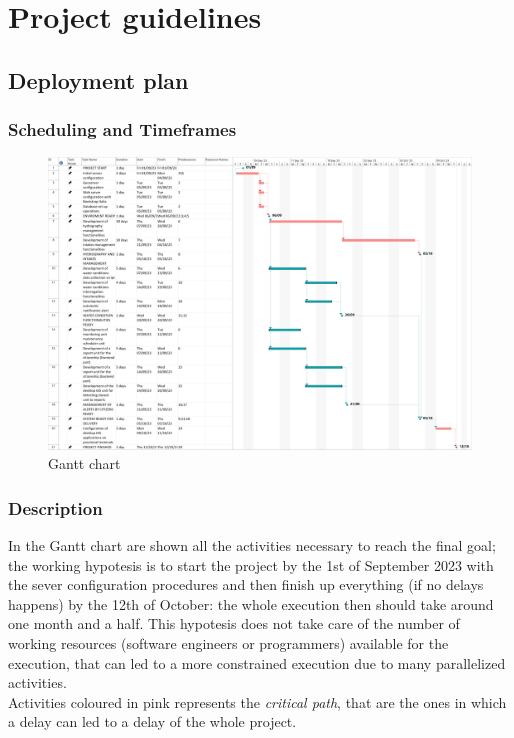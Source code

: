 \section{Project guidelines}
\subsection{Deployment plan}
\subsubsection{Scheduling and Timeframes}
   
\begin{figure}[H]
    \centering
    \includegraphics[width=\textwidth]{img/gantt.png}
    \caption{Gantt chart}
    \label{Gantt}
\end{figure}

\subsubsection{Description}
In the Gantt chart are shown all the activities necessary to reach the final goal; the working hypotesis is to start the project by the 1st of September 2023 with the sever configuration procedures and then finish up everything (if no delays happens) by the 12th of October: the whole execution then should take around one month and a half.
This hypotesis does not take care of the number of working resources (software engineers or programmers) available for the execution, that can led to a more constrained execution due to many parallelized activities. \\
Activities coloured in pink represents the \textit{critical path}, that are the ones in which a delay can led to a delay of the whole project.

